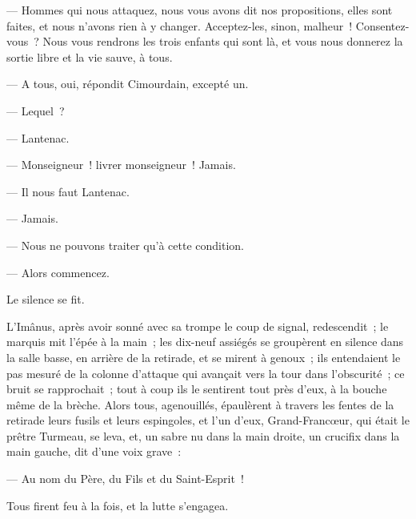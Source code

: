 \documentclass[french,twoside]{book} %
\begin{document}
— Hommes qui nous attaquez, nous vous avons dit nos propositions, elles sont faites, et nous n’avons rien à y changer. Acceptez-les, sinon, malheur ! Consentez-vous ? Nous vous rendrons les trois enfants qui sont là, et vous nous donnerez la sortie libre et la vie sauve, à tous.\par
— A tous, oui, répondit Cimourdain, excepté un.\par
— Lequel ?\par
— Lantenac.\par
— Monseigneur ! livrer monseigneur ! Jamais.\par
— Il nous faut Lantenac.\par
— Jamais.\par
— Nous ne pouvons traiter qu’à cette condition.\par
— Alors commencez.\par
Le silence se fit.\par
L’Imânus, après avoir sonné avec sa trompe le coup de signal, redescendit ; le marquis mit l’épée à la main ;  les dix-neuf assiégés se groupèrent en silence dans la salle basse, en arrière de la retirade, et se mirent à genoux ; ils entendaient le pas mesuré de la colonne d’attaque qui avançait vers la tour dans l’obscurité ; ce bruit se rapprochait ; tout à coup ils le sentirent tout près d’eux, à la bouche même de la brèche. Alors tous, agenouillés, épaulèrent à travers les fentes de la retirade leurs fusils et leurs espingoles, et l’un d’eux, Grand-Francœur, qui était le prêtre Turmeau, se leva, et, un sabre nu dans la main droite, un crucifix dans la main gauche, dit d’une voix grave :\par
— Au nom du Père, du Fils et du Saint-Esprit !\par
Tous firent feu à la fois, et la lutte s’engagea.
\end{document}
